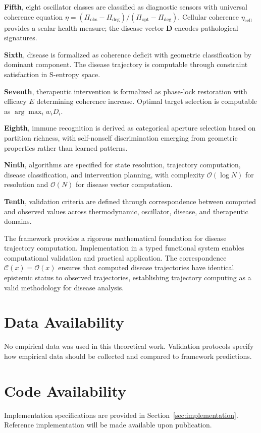 \documentclass[10pt,twocolumn]{article}
\theoremstyle{plain}
\theoremstyle{definition}
\theoremstyle{remark}
\newcommand{\Obs}{\mathcal{O}}
\newcommand{\Comp}{\mathcal{C}}
\newcommand{\etacell}{\eta_{\mathrm{cell}}}
\newcommand{\Dvec}{\mathbf{D}}
\newcommand{\bigO}{\mathcal{O}}
\begin{document}
\textbf{Fifth}, eight oscillator classes are classified as diagnostic sensors with universal coherence equation $\eta = (\Pi_{\mathrm{obs}} - \Pi_{\mathrm{deg}})/(\Pi_{\mathrm{opt}} - \Pi_{\mathrm{deg}})$. Cellular coherence $\etacell$ provides a scalar health measure; the disease vector $\Dvec$ encodes pathological signatures.

\textbf{Sixth}, disease is formalized as coherence deficit with geometric classification by dominant component. The disease trajectory is computable through constraint satisfaction in S-entropy space.

\textbf{Seventh}, therapeutic intervention is formalized as phase-lock restoration with efficacy $E$ determining coherence increase. Optimal target selection is computable as $\arg\max_i w_i D_i$.

\textbf{Eighth}, immune recognition is derived as categorical aperture selection based on partition richness, with self-nonself discrimination emerging from geometric properties rather than learned patterns.

\textbf{Ninth}, algorithms are specified for state resolution, trajectory computation, disease classification, and intervention planning, with complexity $\bigO(\log N)$ for resolution and $\bigO(N)$ for disease vector computation.

\textbf{Tenth}, validation criteria are defined through correspondence between computed and observed values across thermodynamic, oscillator, disease, and therapeutic domains.

The framework provides a rigorous mathematical foundation for disease trajectory computation. Implementation in a typed functional system enables computational validation and practical application. The correspondence $\Comp(x) = \Obs(x)$ ensures that computed disease trajectories have identical epistemic status to observed trajectories, establishing trajectory computing as a valid methodology for disease analysis.

\section*{Data Availability}

No empirical data was used in this theoretical work. Validation protocols specify how empirical data should be collected and compared to framework predictions.

\section*{Code Availability}

Implementation specifications are provided in Section~\ref{sec:implementation}. Reference implementation will be made available upon publication.



\end{document}
